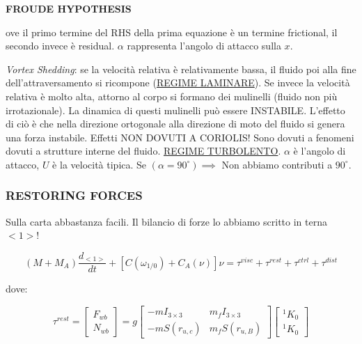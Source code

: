 \begin{itemize}
\begin{defn}{\textbf{FROUDE HYPOTHESIS}}
\end{defn}

ove il primo termine del RHS della prima equazione è un termine frictional, il secondo invece è residual. $\alpha$ rappresenta l'angolo di attacco sulla $x$.

\textit{Vortex Shedding}: se la velocità relativa è relativamente bassa, il fluido poi alla fine dell'attraversamento si ricompone (\underline{REGIME LAMINARE}). Se invece la velocità relativa è molto alta, attorno al corpo si formano dei mulinelli (fluido non più irrotazionale). La dinamica di questi mulinelli può essere INSTABILE. L'effetto di ciò è che nella direzione ortogonale alla direzione di moto del fluido si genera una forza instabile. Effetti NON DOVUTI A CORIOLIS! Sono dovuti a fenomeni dovuti a strutture interne del fluido. \underline{REGIME TURBOLENTO}. $\alpha$ è l'angolo di attacco, $U$ è la velocità tipica. Se $(\alpha=90^{\circ}) \implies$ Non abbiamo contributi a $90^{\circ}$.

\end{itemize}

\subsubsection{RESTORING FORCES}

Sulla carta abbastanza facili. Il bilancio di forze lo abbiamo scritto in terna $<1>$! 

\[
	(M+M_A)\frac{d_{<1>}}{dt} + [C(\omega_{1/0}) + C_A(\nu)]\nu = \tau^{visc} + \tau^{rest} + \tau^{ctrl} + \tau^{dist}
\]

dove:

\[
	\tau^{rest} = \begin{bmatrix}F_{wb}\\N_{wb}\end{bmatrix} = g\begin{bmatrix}-mI_{3\times 3}&m_fI_{3\times 3}\\-mS(r_{u,c})&m_fS(r_{u,B})\end{bmatrix}\begin{bmatrix}^1K_0\\^1K_0\end{bmatrix}
\]

